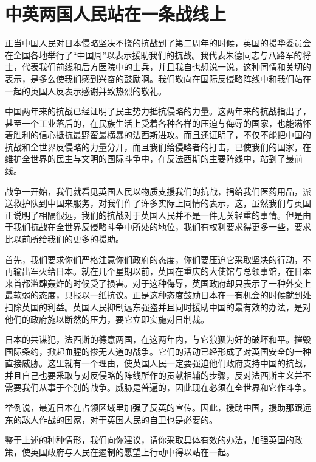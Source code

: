 \section[中英两国人民站在一条战线上（一九三九年六月一日）]{中英两国人民站在一条战线上}


正当中国人民对日本侵略坚决不挠的抗战到了第二周年的时候，英国的援华委员会在全国各地举行了“中国周”以表示援助我们的抗战。我代表朱德同志与八路军的将士，代表我们前线和后方医院中的士兵，并且我自也想说一说，这种同情和关切的表示，是多么使我们感到兴奋的鼓励啊。我们敬向在国际反侵略阵线中和我们站在一起的英国人反表示感谢并致热烈的敬礼。

中国两年来的抗战已经证明了民主势力抵抗侵略的力量。这两年来的抗战指出了，甚至一个工业落后的，在民族生活上受着各种各样的压迫与侮辱的国家，也能满怀着胜利的信心抵抗最野蛮最横暴的法西斯进攻。而且还证明了，不仅不能把中国的抗战和全世界反侵略的力量分开，而且我们给侵略者的打击，已使我们的国家，在维护全世界的民主与文明的国际斗争中，在反法西斯的主要阵线中，站到了最前线。

战争一开始，我们就看见英国人民以物质支援我们的抗战，捐给我们医药用品，派送救护队到中国来服务，对我们作了许多实际上同情的表示，这，虽然我们与英国正说明了相隔很远，我们的抗战对于英国人民并不是一件无关轻重的事情。但是由于我们抗战在全世界反侵略斗争中所处的地位，我们有权利要求得更多一些，要求比以前所给我们的更多的援助。

首先，我们要求你们严格注意你们政府的态度，你们要压迫它采取坚决的行动，不再输出军火给日本。就在几个星期以前，英国在重庆的大使馆与总领事馆，在日本来首都滥肆轰炸的时候受了损害。对于这种侮辱，英国政府却只表示了一种外交上最软弱的态度，只报以一纸抗议。正是这种态度鼓励日本在一有机会的时候就到处扫除英国的利益。英国人民抑制远东强盗并且同时援助中国的最有效的办法，是对他们的政府施以断然的压力，要它立即实施对日制裁。

日本的共谋犯，法西斯的德意两国，在这两年内，与它狼狈为奸的破坏和平。摧毁国际条约，掀起血腥的惨无人道的战争。它们的活动已经形成了对英国安全的一种直接威胁。这里就有一个理由，使英国人民一定要强迫他们政府支持中国的抗战，并且自己也要釆取与对反侵略的阵线所作的贡献相辅的步骤，反对法西斯主义并不需要我们从事于个别的战争。威胁是普遍的，因此现在必须在全世界和它作斗争。

举例说，最近日本在占领区域里加强了反英的宣传。因此，援助中国，援助那跟远东的敌人作战的国家，对于英国人民的自卫也是必要的。

鉴于上述的种种情形，我们向你建议，请你采取具体有效的办法，加强英国的政策，使英国政府与人民在遏制的愿望上行动中得以站在一起。

